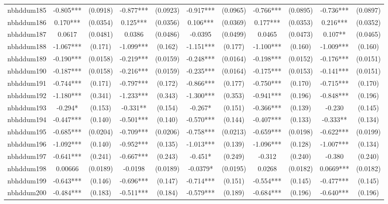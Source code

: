 \documentclass[]{article}
\begin{document}
\begin{tabular}{lcccccccccc}
nbhddum185 & -0.805*** & (0.0918) & -0.877*** & (0.0923) & -0.917*** & (0.0965) & -0.766*** & (0.0895) & -0.736*** & (0.0897) \\
nbhddum186 & 0.170*** & (0.0354) & 0.125*** & (0.0356) & 0.106*** & (0.0369) & 0.177*** & (0.0353) & 0.216*** & (0.0352) \\
nbhddum187 & 0.0617 & (0.0481) & 0.0386 & (0.0486) & -0.0395 & (0.0499) & 0.0465 & (0.0473) & 0.107** & (0.0465) \\
nbhddum188 & -1.067*** & (0.171) & -1.099*** & (0.162) & -1.151*** & (0.177) & -1.100*** & (0.160) & -1.009*** & (0.160) \\
nbhddum189 & -0.190*** & (0.0158) & -0.219*** & (0.0159) & -0.248*** & (0.0164) & -0.198*** & (0.0152) & -0.176*** & (0.0151) \\
nbhddum190 & -0.187*** & (0.0158) & -0.216*** & (0.0159) & -0.235*** & (0.0164) & -0.175*** & (0.0153) & -0.141*** & (0.0151) \\
nbhddum191 & -0.744*** & (0.171) & -0.797*** & (0.172) & -0.866*** & (0.177) & -0.750*** & (0.170) & -0.715*** & (0.170) \\
nbhddum192 & -1.180*** & (0.341) & -1.233*** & (0.343) & -1.300*** & (0.353) & -0.941*** & (0.196) & -0.848*** & (0.196) \\
nbhddum193 & -0.294* & (0.153) & -0.331** & (0.154) & -0.267* & (0.151) & -0.366*** & (0.139) & -0.230 & (0.145) \\
nbhddum194 & -0.447*** & (0.140) & -0.501*** & (0.140) & -0.570*** & (0.144) & -0.407*** & (0.133) & -0.333** & (0.134) \\
nbhddum195 & -0.685*** & (0.0204) & -0.709*** & (0.0206) & -0.758*** & (0.0213) & -0.659*** & (0.0198) & -0.622*** & (0.0199) \\
nbhddum196 & -1.092*** & (0.140) & -0.952*** & (0.135) & -1.013*** & (0.139) & -1.096*** & (0.128) & -1.007*** & (0.134) \\
nbhddum197 & -0.641*** & (0.241) & -0.667*** & (0.243) & -0.451* & (0.249) & -0.312 & (0.240) & -0.380 & (0.240) \\
nbhddum198 & 0.00666 & (0.0189) & -0.0198 & (0.0189) & -0.0379* & (0.0195) & 0.0268 & (0.0182) & 0.0669*** & (0.0182) \\
nbhddum199 & -0.643*** & (0.146) & -0.696*** & (0.147) & -0.714*** & (0.151) & -0.554*** & (0.145) & -0.477*** & (0.145) \\
nbhddum200 & -0.484*** & (0.183) & -0.511*** & (0.184) & -0.579*** & (0.189) & -0.684*** & (0.196) & -0.640*** & (0.196) \\

\end{tabular}
\end{document}
